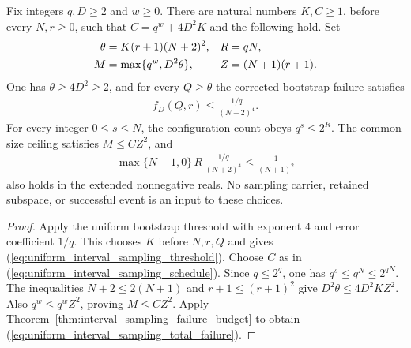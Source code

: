 \begin{theorem}
    \label{thm:uniform_interval_sampling_schedule}
    \leanok
    Fix integers $q,D\ge2$ and $w\ge0$. There are natural numbers
    $K,C\ge1$, before every $N,r\ge0$, such that
    $C=q^w+4D^2K$ and the following hold. Set
    \begin{align}
        \theta & =K(r+1)(N+2)^2,         & R & =qN,\notag   \\
        M      & =\max\{q^w,D^2\theta\}, & Z & =(N+1)(r+1).
        \label{eq:uniform_interval_sampling_schedule}
    \end{align}
    One has $\theta\ge4D^2\ge2$, and for every $Q\ge\theta$ the
    corrected bootstrap failure satisfies
    \begin{align}
        f_D(Q,r)\le\frac{1/q}{(N+2)^4}.
        \label{eq:uniform_interval_sampling_threshold}
    \end{align}
    For every integer $0\le s\le N$, the configuration count obeys
    $q^s\le2^R$. The common size ceiling satisfies $M\le CZ^2$, and
    \begin{align}
        \max\{N-1,0\}\,R\,\frac{1/q}{(N+2)^4}
        \le\frac{1}{(N+1)^2}
        \label{eq:uniform_interval_sampling_total_failure}
    \end{align}
    also holds in the extended nonnegative reals. No sampling carrier,
    retained subspace, or successful event is an input to these choices.
\end{theorem}
\begin{proof}\leanok
    Apply the uniform bootstrap threshold with exponent $4$ and error
    coefficient $1/q$. This chooses $K$ before $N,r,Q$ and gives
    (\ref{eq:uniform_interval_sampling_threshold}).
    Choose $C$ as in (\ref{eq:uniform_interval_sampling_schedule}).
    Since $q\le2^q$, one has $q^s\le q^N\le2^{qN}$.
    The inequalities $N+2\le2(N+1)$ and $r+1\le(r+1)^2$ give
    $D^2\theta\le4D^2KZ^2$. Also $q^w\le q^wZ^2$, proving
    $M\le CZ^2$. Apply Theorem~\ref{thm:interval_sampling_failure_budget}
    to obtain (\ref{eq:uniform_interval_sampling_total_failure}).
\end{proof}

